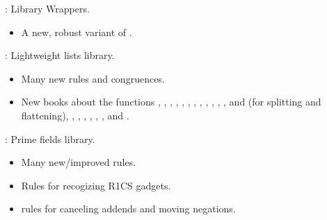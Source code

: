 
\begin{frame}

\implibtitle

:
Library Wrappers.
\begin{itemize}
\item A new, robust variant of .
\end{itemize}

\end{frame}


\begin{frame}

\implibtitle

:
Lightweight lists library.
\begin{itemize}
\item Many new rules and congruences.
\item New books about the functions ,
      , , ,
      , , ,
      , , ,
      , , 
      and  (for splitting and flattening),
      , , ,
      , , ,
      and .
\end{itemize}

\end{frame}


\begin{frame}

\implibtitle

:
Prime fields library.
\begin{itemize}
\item Many new/improved rules.
\item Rules for recogizing R1CS gadgets.
\item {} rules for canceling addends and moving negations.
\end{itemize}

\end{frame}

